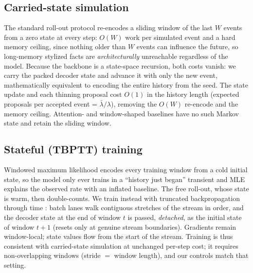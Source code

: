 \subsection{Carried-state simulation}
The standard roll-out protocol re-encodes a sliding window of the last $W$
events from a zero state at every step: $O(W)$ work per simulated event and
a hard memory ceiling, since nothing older than $W$ events can influence the
future, so long-memory stylized facts are \emph{architecturally} unreachable
regardless of the model. Because the backbone is a state-space recursion,
both costs vanish: we carry the packed decoder state and advance it with
only the new event, mathematically equivalent to encoding the entire history
from the seed. The state update and each thinning proposal cost $O(1)$ in the
history length (expected proposals per accepted event =
$\bar\lambda/\lambda$), removing the $O(W)$ re-encode and the memory
ceiling. Attention- and window-shaped baselines have no such Markov state
and retain the sliding window.

\subsection{Stateful (TBPTT) training}
Windowed maximum likelihood encodes every training window from a cold
initial state, so the model only ever trains in a ``history just began''
transient and MLE explains the observed rate with an inflated baseline.
The free roll-out, whose state is warm, then double-counts. We train instead
with truncated backpropagation through time \citep{williams1990tbptt}: batch
lanes walk contiguous stretches of the stream in order, and the decoder
state at the end of window $t$ is passed, \emph{detached}, as the initial
state of window $t{+}1$ (resets only at genuine stream boundaries). Gradients
remain window-local; state values flow from the start of the stream.
Training is thus consistent with carried-state simulation at unchanged
per-step cost; it requires non-overlapping windows (stride $=$ window
length), and our controls match that setting.

